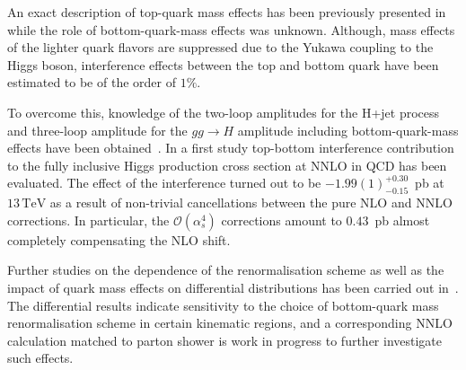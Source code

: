 \documentclass{FBR_Bericht_2025}
\begin{document}
\begin{refsection}
An exact description of top-quark mass effects has been previously presented in~ while the role of bottom-quark-mass effects was unknown. Although, mass effects of the lighter quark flavors are suppressed due to the Yukawa coupling to the Higgs boson, interference effects between the top and bottom quark have been estimated to be of the order of $1\%$. 

To overcome this, knowledge of the two-loop amplitudes for the H+jet process and three-loop amplitude for the $gg \to H$ amplitude including bottom-quark-mass effects have been obtained~. In a first study \cite{Czakon:2023kqm} top-bottom interference contribution to the fully inclusive Higgs production cross section at NNLO in QCD has been evaluated. The effect of the interference turned out to be $-1.99(1)^{+0.30}_{-0.15}$~pb at $13\,\mathrm{TeV}$ as a result of non-trivial cancellations between the pure NLO and NNLO corrections. In particular, the $\mathcal{O}(\alpha_s^4)$ corrections amount to $0.43$~pb almost completely compensating the NLO shift.

Further studies on the dependence of the renormalisation scheme as well as the impact of quark mass effects on differential distributions has been carried out in~. The differential results indicate sensitivity to the choice of bottom-quark mass renormalisation scheme in certain kinematic regions, and a corresponding NNLO calculation matched to parton shower is work in progress to further investigate such effects.




\end{refsection}
\end{document}
